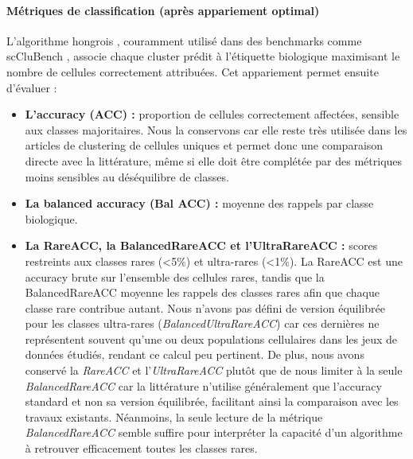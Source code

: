 \paragraph{Métriques de classification (après appariement optimal)}
L'algorithme hongrois \cite{kuhn1955hungarian}, couramment utilisé dans des benchmarks comme scCluBench \cite{xu_scclubench_2026}, associe chaque cluster prédit à l'étiquette biologique maximisant le nombre de cellules correctement attribuées. Cet appariement permet ensuite d'évaluer :
\begin{itemize}
    \item \textbf{L'accuracy (ACC) :} proportion de cellules correctement affectées, sensible aux classes majoritaires. Nous la conservons car elle reste très utilisée dans les articles de clustering de cellules uniques et permet donc une comparaison directe avec la littérature, même si elle doit être complétée par des métriques moins sensibles au déséquilibre de classes.
    \item \textbf{La balanced accuracy (Bal ACC) :} moyenne des rappels par classe biologique.
    \item \textbf{La RareACC, la BalancedRareACC et l'UltraRareACC :} scores restreints aux classes rares (<5\%) et ultra-rares (<1\%). La RareACC est une accuracy brute sur l'ensemble des cellules rares, tandis que la BalancedRareACC moyenne les rappels des classes rares afin que chaque classe rare contribue autant. Nous n'avons pas défini de version équilibrée pour les classes ultra-rares (\textit{BalancedUltraRareACC}) car ces dernières ne représentent souvent qu'une ou deux populations cellulaires dans les jeux de données étudiés, rendant ce calcul peu pertinent. De plus, nous avons conservé la \textit{RareACC} et l'\textit{UltraRareACC} plutôt que de nous limiter à la seule \textit{BalancedRareACC} car la littérature n'utilise généralement que l'accuracy standard et non sa version équilibrée, facilitant ainsi la comparaison avec les travaux existants. Néanmoins, la seule lecture de la métrique \textit{BalancedRareACC} semble suffire pour interpréter la capacité d'un algorithme à retrouver efficacement toutes les classes rares.
\end{itemize}

